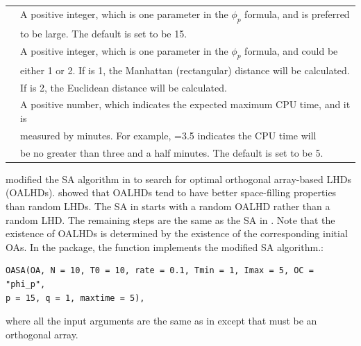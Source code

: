 \begin{table}[!htb]
\begin{center}
\begin{tabular}{ll}
				\RR{p} & A positive integer, which is one parameter in the $\phi_{p}$ formula, and \RR{p} is preferred \\
				& to be large. The default is set to be 15.\\
				\RR{q} & A positive integer, which is one parameter in the $\phi_{p}$ formula, and \RR{q} could be\\
				& either 1 or 2. If \RR{q} is 1, the Manhattan (rectangular) distance will be calculated. \\
				& If \RR{q} is 2, the Euclidean distance will be calculated.\\
				\RR{maxtime} & A positive number, which indicates the expected maximum CPU time, and it is\\
				& measured by minutes. For example, \RR{maxtime}=3.5 indicates the CPU time will \\
				& be no greater than three and a half minutes. The default is set to be 5.\\
				\hline
		\end{tabular}
	\end{center}
\end{table}

\cite{leary2003optimal} modified the SA algorithm in \cite{morris1995exploratory} to search for optimal orthogonal array-based LHDs (OALHDs). \cite{tang1993orthogonal} showed that OALHDs tend to have better space-filling properties than random LHDs. The SA in \cite{leary2003optimal} starts with a random OALHD rather than a random LHD. %
The remaining steps are the same as the SA in \cite{morris1995exploratory}. Note that the existence of OALHDs is determined by the existence of the corresponding initial OAs. In the  package, the function  implements the modified SA algorithm.:
\begin{verbatim}
OASA(OA, N = 10, T0 = 10, rate = 0.1, Tmin = 1, Imax = 5, OC = "phi_p",
p = 15, q = 1, maxtime = 5),
\end{verbatim}
\noindent where all the input arguments are the same as in  except that  must be an orthogonal array.

